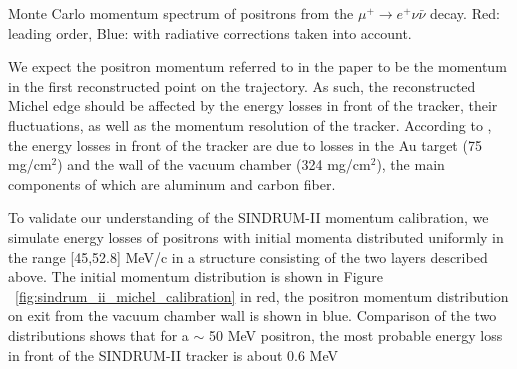  {
  \label{fig:mu2e_5645_fig_001_mue3_decay}
  Monte Carlo momentum spectrum of positrons from the $\mu^+ \rightarrow e^+ \nu \bar{\nu}$
  decay. Red: leading order, Blue: with radiative corrections taken into account.
}
\vspace{0.1in}

We expect the positron momentum referred to in the paper
to be the momentum in the first reconstructed point on the trajectory. As such, the
reconstructed Michel edge should be affected by the energy losses in front of the
tracker, their fluctuations, as well as the momentum resolution of the tracker.
According to \cite{sindrum_ii:Bertl2006}, the energy losses in front of the tracker
are due to losses in the Au target (75 mg/cm$^2$) and the wall of the
vacuum chamber (324 mg/cm$^2$), the main components of which are aluminum and carbon fiber.

To validate our understanding of the SINDRUM-II momentum calibration,
we simulate energy losses of positrons with initial momenta distributed uniformly
in the range [45,52.8] MeV/c in a structure consisting of the two layers described
above. The initial momentum distribution is shown
in Figure ~\ref{fig:sindrum_ii_michel_calibration} in red,
the positron momentum distribution on exit from the vacuum chamber wall is shown in blue.
Comparison of the two distributions shows that for a $\sim$ 50 MeV positron, the most probable
energy loss in front of the SINDRUM-II tracker is about 0.6 MeV

